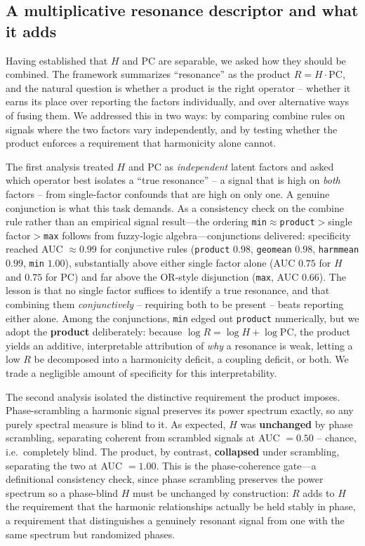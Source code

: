 \documentclass[11pt]{article}
\begin{document}
\subsection{A multiplicative resonance descriptor and what it adds}
Having established that $H$ and $\mathrm{PC}$ are separable, we asked how they should be combined. The framework summarizes ``resonance'' as the product $R=H\cdot\mathrm{PC}$, and the natural question is whether a product is the right operator -- whether it earns its place over reporting the factors individually, and over alternative ways of fusing them. We addressed this in two ways: by comparing combine rules on signals where the two factors vary independently, and by testing whether the product enforces a requirement that harmonicity alone cannot.

The first analysis treated $H$ and $\mathrm{PC}$ as \emph{independent} latent factors and asked which operator best isolates a ``true resonance'' -- a signal that is high on \emph{both} factors -- from single-factor confounds that are high on only one. A genuine conjunction is what this task demands. As a consistency check on the combine rule rather than an empirical signal result---the ordering \texttt{min}$\approx$\texttt{product}$>$single factor$>$\texttt{max} follows from fuzzy-logic algebra---conjunctions delivered: specificity reached AUC $\approx\mathbf{0.99}$ for conjunctive rules (\texttt{product} $0.98$, \texttt{geomean} $0.98$, \texttt{harmmean} $0.99$, \texttt{min} $1.00$), substantially above either single factor alone (AUC $0.75$ for $H$ and $0.75$ for $\mathrm{PC}$) and far above the OR-style disjunction (\texttt{max}, AUC $0.66$). The lesson is that no single factor suffices to identify a true resonance, and that combining them \emph{conjunctively} -- requiring both to be present -- beats reporting either alone. Among the conjunctions, \texttt{min} edged out \texttt{product} numerically, but we adopt the \textbf{product} deliberately: because $\log R = \log H + \log\mathrm{PC}$, the product yields an additive, interpretable attribution of \emph{why} a resonance is weak, letting a low $R$ be decomposed into a harmonicity deficit, a coupling deficit, or both. We trade a negligible amount of specificity for this interpretability.

The second analysis isolated the distinctive requirement the product imposes. Phase-scrambling a harmonic signal preserves its power spectrum exactly, so any purely spectral measure is blind to it. As expected, $H$ was \textbf{unchanged} by phase scrambling, separating coherent from scrambled signals at AUC $=\mathbf{0.50}$ -- chance, i.e.\ completely blind. The product, by contrast, \textbf{collapsed} under scrambling, separating the two at AUC $=\mathbf{1.00}$. This is the phase-coherence gate---a definitional consistency check, since phase scrambling preserves the power spectrum so a phase-blind $H$ must be unchanged by construction: $R$ adds to $H$ the requirement that the harmonic relationships actually be held stably in phase, a requirement that distinguishes a genuinely resonant signal from one with the same spectrum but randomized phases.
\end{document}
